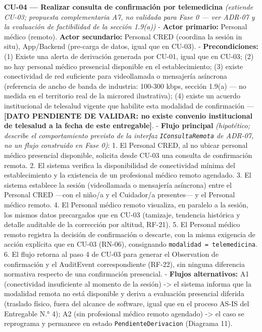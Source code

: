 \documentclass[11pt,a4paper]{article}
\begin{document}
\textbf{CU-04 --- Realizar consulta de confirmación por telemedicina} \emph{(extiende CU-03; propuesta complementaria A7, no validada para Fase 0 --- ver ADR-07 y la evaluación de factibilidad de la sección 1.9(a))}
- \textbf{Actor primario:} Personal médico (remoto). \textbf{Actor secundario:} Personal CRED (coordina la sesión in situ), App/Backend (pre-carga de datos, igual que en CU-03).
- \textbf{Precondiciones:} (1) Existe una alerta de derivación generada por CU-01, igual que en CU-03; (2) no hay personal médico presencial disponible en el establecimiento; (3) existe conectividad de red suficiente para videollamada o mensajería asíncrona (referencia de ancho de banda de industria: 100-300 kbps, sección 1.9(a) --- no medida en el territorio real de la microred ilustrativa); (4) existe un acuerdo institucional de telesalud vigente que habilite esta modalidad de confirmación --- \textbf{{[}DATO PENDIENTE DE VALIDAR: no existe convenio institucional de telesalud a la fecha de este entregable{]}}.
- \textbf{Flujo principal} \emph{(hipotético; describe el comportamiento previsto de la interfaz \texttt{IConsultaRemota} de ADR-07, no un flujo construido en Fase 0)}:
1. El Personal CRED, al no ubicar personal médico presencial disponible, solicita desde CU-03 una consulta de confirmación remota.
2. El sistema verifica la disponibilidad de conectividad mínima del establecimiento y la existencia de un profesional médico remoto agendado.
3. El sistema establece la sesión (videollamada o mensajería asíncrona) entre el Personal CRED ---con el niño/a y el Cuidador/a presentes--- y el Personal médico remoto.
4. El Personal médico remoto visualiza, en paralelo a la sesión, los mismos datos precargados que en CU-03 (tamizaje, tendencia histórica y detalle auditable de la corrección por altitud, RF-21).
5. El Personal médico remoto registra la decisión de confirmación o descarte, con la misma exigencia de acción explícita que en CU-03 (RN-06), consignando \texttt{modalidad\ =\ telemedicina}.
6. El flujo retorna al paso 4 de CU-03 para generar el Observation de confirmación y el AuditEvent correspondiente (RF-22), sin ninguna diferencia normativa respecto de una confirmación presencial.
- \textbf{Flujos alternativos:} A1 (conectividad insuficiente al momento de la sesión) -\textgreater{} el sistema informa que la modalidad remota no está disponible y deriva a evaluación presencial diferida (traslado físico, fuera del alcance de software, igual que en el proceso AS-IS del Entregable N.° 4); A2 (sin profesional médico remoto agendado) -\textgreater{} el caso se reprograma y permanece en estado \texttt{PendienteDerivacion} (Diagrama 11).
\end{document}
